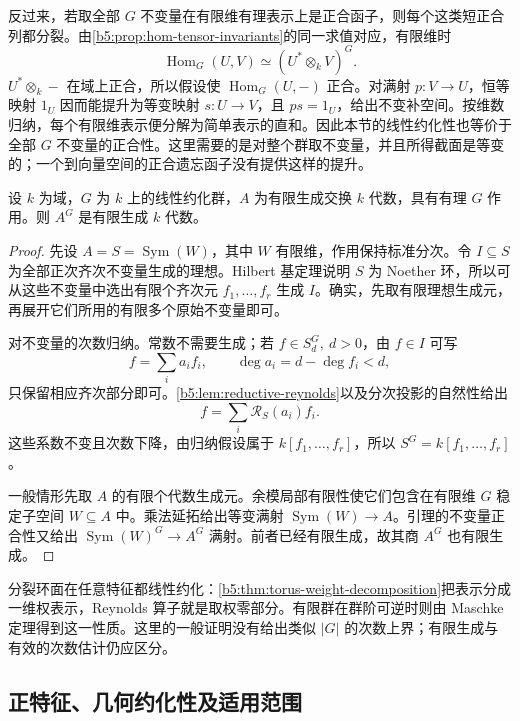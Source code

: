 反过来，若取全部 \(G\) 不变量在有限维有理表示上是正合函子，则每个这类短正合列都分裂。由\cref{b5:prop:hom-tensor-invariants}的同一求值对应，有限维时
\[
	\operatorname{Hom}_G(U,V)\simeq(U^*\otimes_kV)^G.
\]
\(U^*\otimes_k-\) 在域上正合，所以假设使 \(\operatorname{Hom}_G(U,-)\) 正合。对满射 \(p:V\to U\)，恒等映射 \(1_U\) 因而能提升为等变映射 \(s:U\to V\)，且 \(ps=1_U\)，给出不变补空间。按维数归纳，每个有限维表示便分解为简单表示的直和。因此本节的线性约化性也等价于全部 \(G\) 不变量的正合性。这里需要的是对整个群取不变量，并且所得截面是等变的；一个到向量空间的正合遗忘函子没有提供这样的提升。

\begin{theorem}[线性约化群的有限生成]\label{b5:thm:reductive-hilbert-finiteness}
	设 \(k\) 为域，\(G\) 为 \(k\) 上的线性约化群，\(A\) 为有限生成交换 \(k\) 代数，具有有理 \(G\) 作用。则 \(A^G\) 是有限生成 \(k\) 代数。
\end{theorem}
\begin{proof}
	先设 \(A=S=\operatorname{Sym}(W)\)，其中 \(W\) 有限维，作用保持标准分次。令 \(I\subseteq S\) 为全部正次齐次不变量生成的理想。Hilbert 基定理说明 \(S\) 为 Noether 环，所以可从这些不变量中选出有限个齐次元 \(f_1,\ldots,f_r\) 生成 \(I\)。确实，先取有限理想生成元，再展开它们所用的有限多个原始不变量即可。

	对不变量的次数归纳。常数不需要生成；若 \(f\in S_d^G,\ d>0\)，由 \(f\in I\) 可写
	\[
		f=\sum_i a_if_i,\qquad \deg a_i=d-\deg f_i<d,
	\]
	只保留相应齐次部分即可。\cref{b5:lem:reductive-reynolds}以及分次投影的自然性给出
	\[
		f=\sum_i\mathcal R_S(a_i)f_i.
	\]
	这些系数不变且次数下降，由归纳假设属于 \(k[f_1,\ldots,f_r]\)，所以 \(S^G=k[f_1,\ldots,f_r]\)。

	一般情形先取 \(A\) 的有限个代数生成元。余模局部有限性使它们包含在有限维 \(G\) 稳定子空间 \(W\subseteq A\) 中。乘法延拓给出等变满射 \(\operatorname{Sym}(W)\to A\)。引理的不变量正合性又给出 \(\operatorname{Sym}(W)^G\to A^G\) 满射。前者已经有限生成，故其商 \(A^G\) 也有限生成。
\end{proof}

分裂环面在任意特征都线性约化：\cref{b5:thm:torus-weight-decomposition}把表示分成一维权表示，Reynolds 算子就是取权零部分。有限群在群阶可逆时则由 Maschke 定理得到这一性质。这里的一般证明没有给出类似 \(|G|\) 的次数上界；有限生成与有效的次数估计仍应区分。

\subsection{正特征、几何约化性及适用范围}
\label{b5:subsec:2207:02}

